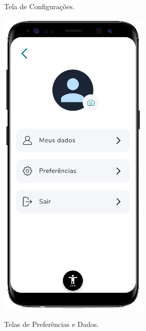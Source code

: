 \begin{figure}[htb]
    \centering
    \begin{minipage}{0.42\textwidth}
        \centering
        \caption{Tela de Configurações.}\label{fig_app_sett}
        \includegraphics[scale=0.69]{Imagens/desenvolvimento/app/app_sett.png}
    \end{minipage}
    \hfill
    \begin{minipage}{0.53\textwidth}
        \centering
        \caption{Telas de Preferências e Dados.}\label{fig_app_dat_pref}

\end{minipage}
\end{figure}
